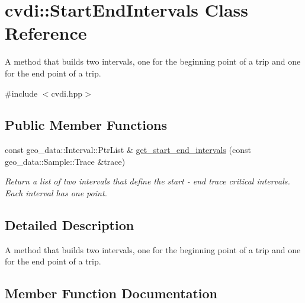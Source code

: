 \hypertarget{classcvdi_1_1StartEndIntervals}{}\section{cvdi\+:\+:Start\+End\+Intervals Class Reference}
\label{classcvdi_1_1StartEndIntervals}


A method that builds two intervals, one for the beginning point of a trip and one for the end point of a trip.  




{\ttfamily \#include $<$cvdi.\+hpp$>$}

\subsection*{Public Member Functions}
\begin{DoxyCompactItemize}
\item 
const geo\+\_\+data\+::\+Interval\+::\+Ptr\+List \& \hyperlink{classcvdi_1_1StartEndIntervals_a107b1a502ab7c2f868c07b1930ee4801}{get\+\_\+start\+\_\+end\+\_\+intervals} (const geo\+\_\+data\+::\+Sample\+::\+Trace \&trace)
\begin{DoxyCompactList}\small\item\em Return a list of two intervals that define the start -\/ end trace critical intervals. Each interval has one point. \end{DoxyCompactList}\end{DoxyCompactItemize}


\subsection{Detailed Description}
A method that builds two intervals, one for the beginning point of a trip and one for the end point of a trip. 

\subsection{Member Function Documentation}
